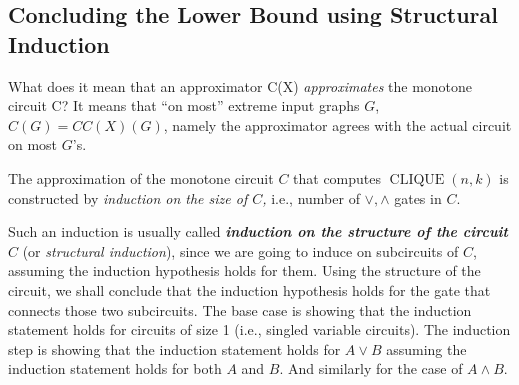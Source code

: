 %


\subsection{Concluding the Lower Bound using Structural Induction    }



% 



What does it mean that an approximator C(X) \emph{approximates} the monotone circuit C? It means that ``on most'' extreme input graphs $G$, $C(G) = CC(X)(G)$, namely the approximator agrees with the actual circuit on most $G$'s. 

The approximation of the  monotone circuit $C$ that computes $\operatorname{CLIQUE}(n, k)$ is constructed  by\emph{ induction on the size of $C$,} i.e., number of $\lor, \wedge$ gates in $C$.


\begin{tcolorbox}[colframe=white, colback=gray!11, boxrule=0mm, sharp corners]
\begin{note} Such an induction is usually called \emph{\textbf{induction on the structure of the circuit} $C$} (or \emph{structural induction}), since we are going to induce on subcircuits of $C$, assuming the induction hypothesis holds for them. Using the structure of the circuit, we shall conclude that the induction hypothesis  holds for the gate that connects those two subcircuits. The base case is showing that the induction statement holds for circuits of size 1 (i.e., singled variable circuits). The induction step is showing that the induction statement holds for $A\lor B$ assuming the induction statement holds for both $A$ and $B$. And similarly for the case of $A\land B$.     
\end{note}
\end{tcolorbox}

